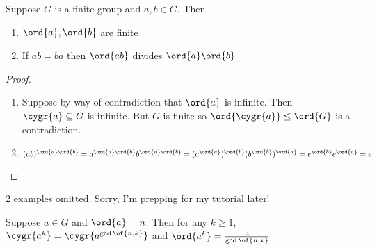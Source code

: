\begin{corollary}
    Suppose $G$ is a finite group and $a,b \in G$. Then \begin{enumerate}
        \item $\ord{a}, \ord{b}$ are finite
        \item If $ab = ba$ then $\ord{ab}$ divides $\ord{a} \ord{b}$
    \end{enumerate}
\end{corollary}
\begin{proof}
    \begin{enumerate}
        \item Suppose by way of contradiction that $\ord{a}$ is infinite. Then $\cygr{a} \subseteq G$ is infinite. But $G$ is finite so $\ord{\cygr{a}} \leq \ord{G}$ is a contradiction.
        \item $(ab)^{\ord{a}\ord{b}} = a^{\ord{a}\ord{b}}b^{\ord{a}\ord{b}} = (a^{\ord{a}})^{\ord{b}}(b^{\ord{b}})^{\ord{a}} = e^{\ord{b}}e^{\ord{a}} = e$
    \end{enumerate}
\end{proof}

2 examples omitted. Sorry, I'm prepping for my tutorial later! 

\begin{theorem}
    Suppose $a \in G$ and $\ord{a} = n$. Then for any $k \geq 1$, $\cygr{a^k} = \cygr{a^{\gcd \of{n,k}}}$ and $\ord{a^k} = \frac{n}{\gcd \of{n, k}}$
\end{theorem}

